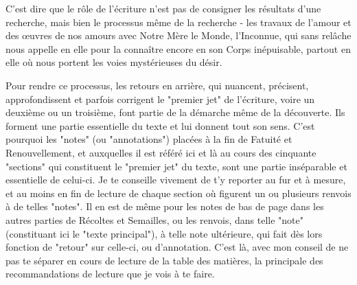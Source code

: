 C'est dire que le rôle de l'écriture n'est pas de consigner les résultats d'une recherche, mais bien le processus même de la recherche - les travaux de l'amour et des œuvres de nos amours avec Notre Mère le Monde, l'Inconnue, qui sans relâche nous appelle en elle pour la connaître encore en son Corps inépuisable, partout en elle où nous portent les voies mystérieuses du désir.

Pour rendre ce processus, les retours en arrière, qui nuancent, précisent, approfondissent et parfois corrigent le "premier jet" de l'écriture, voire un deuxième ou un troisième, font partie de la démarche même de la découverte. Ils forment une partie essentielle du texte et lui donnent tout son sens. C’est pourquoi les "notes" (ou "annotations") placées à la fin de Fatuité et Renouvellement, et auxquelles il est référé ici et là au cours des cinquante "sections" qui constituent le "premier jet" du texte, sont une partie inséparable et essentielle de celui-ci. Je te conseille vivement de t'y reporter au fur et à mesure, et au moins en fin de lecture de chaque section où figurent un ou plusieurs renvois à de telles "notes". Il en est de même pour les notes de bas de page dans les autres parties de Récoltes et Semailles, ou les renvois, dans telle "note" (constituant ici le "texte principal"), à telle note ultérieure, qui fait dès lors fonction de "retour" sur celle-ci, ou d'annotation. C'est là, avec mon conseil de ne pas te séparer en cours de lecture de la table des matières, la principale des recommandations de lecture que je vois à te faire.

